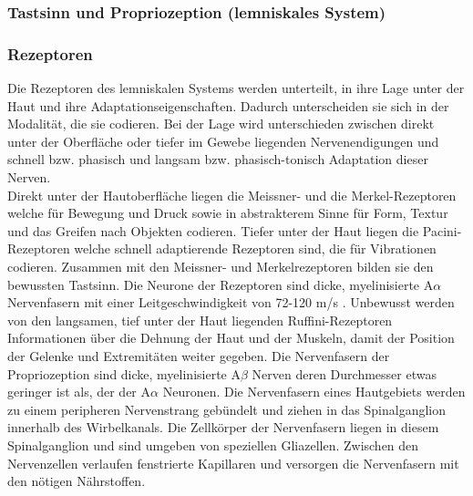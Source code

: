 \documentclass[12pt,a4paper,pdftex]{article}
\begin{document}
\subsubsection{Tastsinn und Propriozeption (lemniskales System)}

\subsubsection*{Rezeptoren}
Die Rezeptoren des lemniskalen Systems werden unterteilt, in ihre Lage unter der Haut und ihre Adaptationseigenschaften. Dadurch unterscheiden sie sich in der Modalität, die sie codieren. Bei der Lage wird unterschieden zwischen direkt unter der Oberfläche oder tiefer im Gewebe liegenden Nervenendigungen und schnell bzw. phasisch und langsam bzw. phasisch-tonisch Adaptation dieser Nerven.\\
Direkt unter der Hautoberfläche liegen die Meissner- und die Merkel-Rezeptoren welche für Bewegung und Druck sowie in abstrakterem Sinne für Form, Textur und das Greifen nach Objekten codieren. \cite[Kap.~24]{paxinos2014rat} Tiefer unter der Haut liegen die Pacini-Rezeptoren welche schnell adaptierende Rezeptoren sind, die für Vibrationen codieren. Zusammen mit den Meissner- und Merkelrezeptoren bilden sie den bewussten Tastsinn. Die Neurone der Rezeptoren sind dicke, myelinisierte A$\alpha$ Nervenfasern mit einer Leitgeschwindigkeit von 72-120 m/s \cite[Kap.~22]{kandel2013principles}. Unbewusst werden von den langsamen, tief unter der Haut liegenden Ruffini-Rezeptoren Informationen über die Dehnung der Haut und der Muskeln, damit der Position der Gelenke und Extremitäten weiter gegeben.
Die Nervenfasern der Propriozeption sind dicke, myelinisierte A$\beta$ Nerven deren Durchmesser etwas geringer ist als, der der A$\alpha$ Neuronen.
Die Nervenfasern eines Hautgebiets werden zu einem peripheren Nervenstrang gebündelt und ziehen in das Spinalganglion innerhalb des Wirbelkanals. Die Zellkörper der Nervenfasern liegen in diesem Spinalganglion und sind umgeben von speziellen Gliazellen. Zwischen den Nervenzellen verlaufen fenstrierte Kapillaren und versorgen die Nervenfasern mit den nötigen Nährstoffen. 
\end{document}
